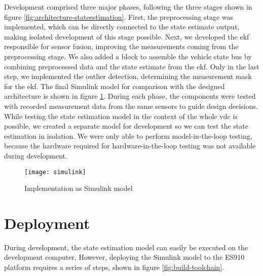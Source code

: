 Development comprised three major phases, following the three stages shown in figure \ref{fig:architecture-stateestimation}. First, the preprocessing stage was implemented, which can be directly connected to the state estimate output, making isolated development of this stage possible. Next, we developed the \gls{ekf} responsible for sensor fusion, improving the measurements coming from the preprocessing stage. We also added a block to assemble the vehicle state bus by combining preprocessed data and the state estimate from the \gls{ekf}. Only in the last step, we implemented the outlier detection, determining the measurement mask for the \gls{ekf}. The final Simulink model for comparison with the designed architecture is shown in figure \ref{fig:simulink}. During each phase, the components were tested with recorded measurement data from the same sensors to guide design decisions. While testing the state estimation model in the context of the whole \gls{vdc} is possible, we created a separate model for development so we can test the state estimation in isolation. We were only able to perform model-in-the-loop testing, because the hardware required for hardware-in-the-loop testing was not available during development.

\begin{figure}
	\centering
	\texttt{[image: simulink]}%
	\caption{Implementation as Simulink model}
	\label{fig:simulink}
\end{figure}


\section{Deployment}
During development, the state estimation model can easily be executed on the development computer. However, deploying the Simulink model to the ES910 platform requires a series of steps, shown in figure \ref{fig:build-toolchain}.

